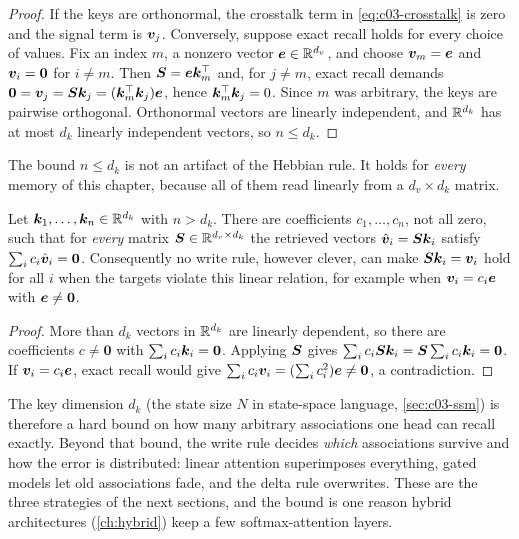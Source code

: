 \begin{proof}
If the keys are orthonormal, the crosstalk term in \cref{eq:c03-crosstalk} is zero and the
signal term is $\bm{v}_j$. Conversely, suppose exact recall holds for every choice of values. Fix
an index $m$, a nonzero vector $\bm{e}\in\mathbb{R}^{d_v}$, and choose $\bm{v}_m=\bm{e}$ and $\bm{v}_i=\bm 0$ for
$i\ne m$. Then $\bm{S}=\bm{e}\bm{k}_m^{\top}$ and, for $j\ne m$, exact recall demands
$\bm 0=\bm{v}_j=\bm{S}\bm{k}_j=(\bm{k}_m^{\top}\bm{k}_j)\bm{e}$, hence $\bm{k}_m^{\top}\bm{k}_j=0$. Since $m$ was arbitrary, the
keys are pairwise orthogonal. Orthonormal vectors are linearly independent, and $\mathbb{R}^{d_k}$ has
at most $d_k$ linearly independent vectors, so $n\le d_k$.
\end{proof}

The bound $n\le d_k$ is not an artifact of the Hebbian rule. It holds for \emph{every} memory
of this chapter, because all of them read linearly from a $d_v\times d_k$ matrix.

\begin{proposition}\label{prop:c03-capacity}
Let $\bm{k}_1,\dots,\bm{k}_n\in\mathbb{R}^{d_k}$ with $n>d_k$. There are coefficients $c_1,\dots,c_n$, not
all zero, such that for \emph{every} matrix $\bm{S}\in\mathbb{R}^{d_v\times d_k}$ the retrieved vectors
$\hat{\bm{v}}_i=\bm{S}\bm{k}_i$ satisfy $\sum_i c_i\hat{\bm{v}}_i=\bm 0$. Consequently no write rule, however
clever, can make $\bm{S}\bm{k}_i=\bm{v}_i$ hold for all $i$ when the targets violate this linear
relation, for example when $\bm{v}_i=c_i\bm{e}$ with $\bm{e}\ne\bm 0$.
\end{proposition}

\begin{proof}
More than $d_k$ vectors in $\mathbb{R}^{d_k}$ are linearly dependent, so there are coefficients
$c\ne\bm 0$ with $\sum_i c_i\bm{k}_i=\bm 0$. Applying $\bm{S}$ gives
$\sum_i c_i\bm{S}\bm{k}_i=\bm{S}\sum_i c_i\bm{k}_i=\bm 0$. If $\bm{v}_i=c_i\bm{e}$, exact recall would give
$\sum_i c_i\bm{v}_i=(\sum_i c_i^2)\bm{e}\ne\bm 0$, a contradiction.
\end{proof}

The key dimension $d_k$ (the state size $N$ in state-space language, \cref{sec:c03-ssm}) is
therefore a hard bound on how many arbitrary associations one head can recall exactly. Beyond
that bound, the write rule decides \emph{which} associations survive and how the error is
distributed: linear attention superimposes everything, gated models let old associations fade,
and the delta rule overwrites. These are the three strategies of the next sections, and the
bound is one reason hybrid architectures (\cref{ch:hybrid}) keep a few softmax-attention layers.

